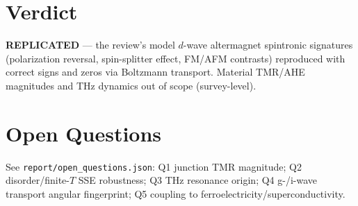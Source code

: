 \documentclass[11pt]{article}
\begin{document}
\section{Verdict}
\textbf{REPLICATED} --- the review's model $d$-wave altermagnet spintronic signatures (polarization
reversal, spin-splitter effect, FM/AFM contrasts) reproduced with correct signs and zeros via
Boltzmann transport. Material TMR/AHE magnitudes and THz dynamics out of scope (survey-level).

\section*{Open Questions}
See \texttt{report/open\_questions.json}: Q1 junction TMR magnitude; Q2 disorder/finite-$T$ SSE
robustness; Q3 THz resonance origin; Q4 g-/i-wave transport angular fingerprint; Q5 coupling to
ferroelectricity/superconductivity.
\end{document}
